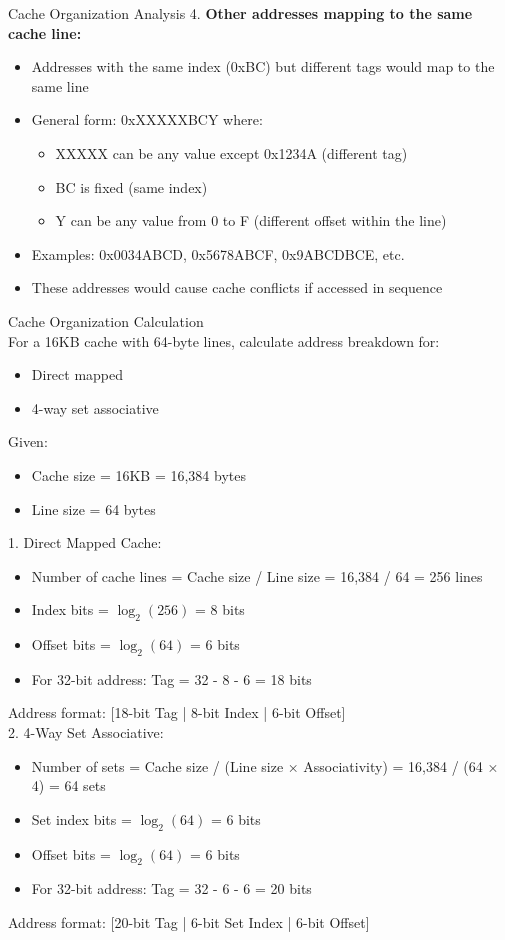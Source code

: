 \begin{example2}{Cache Organization Analysis}
4. \textbf{Other addresses mapping to the same cache line:}
   \begin{itemize}
     \item Addresses with the same index (0xBC) but different tags would map to the same line
     \item General form: 0xXXXXXBCY where:
     \begin{itemize}
       \item XXXXX can be any value except 0x1234A (different tag)
       \item BC is fixed (same index)
       \item Y can be any value from 0 to F (different offset within the line)
     \end{itemize}
     \item Examples: 0x0034ABCD, 0x5678ABCF, 0x9ABCDBCE, etc.
     \item These addresses would cause cache conflicts if accessed in sequence
   \end{itemize}
\end{example2}

\begin{example2}{Cache Organization Calculation}\\
For a 16KB cache with 64-byte lines, calculate address breakdown for:
\begin{itemize}
\item Direct mapped
\item 4-way set associative
\end{itemize}
\tcblower
Given:
\begin{itemize}
    \item Cache size = 16KB = 16,384 bytes
    \item Line size = 64 bytes
\end{itemize}

1. Direct Mapped Cache:
\begin{itemize}
    \item Number of cache lines = Cache size / Line size = 16,384 / 64 = 256 lines
    \item Index bits = $\log_2(256)$ = 8 bits
    \item Offset bits = $\log_2(64)$ = 6 bits
    \item For 32-bit address: Tag = 32 - 8 - 6 = 18 bits
\end{itemize}
Address format: [18-bit Tag | 8-bit Index | 6-bit Offset]
\vspace{2mm}\\
2. 4-Way Set Associative:
\begin{itemize}
    \item Number of sets = Cache size / (Line size × Associativity) = 16,384 / (64 × 4) = 64 sets
    \item Set index bits = $\log_2(64)$ = 6 bits
    \item Offset bits = $\log_2(64)$ = 6 bits
    \item For 32-bit address: Tag = 32 - 6 - 6 = 20 bits
\end{itemize}   
Address format: [20-bit Tag | 6-bit Set Index | 6-bit Offset]
\end{example2}

